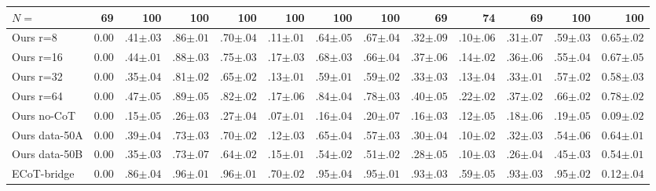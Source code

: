 \documentclass{article}
\begin{document}
\begin{table}[t]
\begin{tabular}{l r r r r r r r r r r r | r}
$N=$ & 69 & 100 & 100 & 100 & 100 & 100 & 100 & 69 & 74 & 69 & 100 & 100 \\
\midrule
Ours r=8       & 0.00 & .41\tiny{$\pm .03$} & .86\tiny{$\pm .01$} & .70\tiny{$\pm .04$} & .11\tiny{$\pm .01$} & .64\tiny{$\pm .05$} & .67\tiny{$\pm .04$} & .32\tiny{$\pm .09$} & .10\tiny{$\pm .06$} & .31\tiny{$\pm .07$} & .59\tiny{$\pm .03$} & 0.65\tiny{$\pm .02$} \\
Ours r=16      & 0.00 & .44\tiny{$\pm .01$} & .88\tiny{$\pm .03$} & .75\tiny{$\pm .03$} & .17\tiny{$\pm .03$} & .68\tiny{$\pm .03$} & .66\tiny{$\pm .04$} & .37\tiny{$\pm .06$} & .14\tiny{$\pm .02$} & .36\tiny{$\pm .06$} & .55\tiny{$\pm .04$} & 0.67\tiny{$\pm .05$} \\
Ours r=32      & 0.00 & .35\tiny{$\pm .04$} & .81\tiny{$\pm .02$} & .65\tiny{$\pm .02$} & .13\tiny{$\pm .01$} & .59\tiny{$\pm .01$} & .59\tiny{$\pm .02$} & .33\tiny{$\pm .03$} & .13\tiny{$\pm .04$} & .33\tiny{$\pm .01$} & .57\tiny{$\pm .02$} & 0.58\tiny{$\pm .03$} \\
Ours r=64      & 0.00 & .47\tiny{$\pm .05$} & .89\tiny{$\pm .05$} & .82\tiny{$\pm .02$} & .17\tiny{$\pm .06$} & .84\tiny{$\pm .04$} & .78\tiny{$\pm .03$} & .40\tiny{$\pm .05$} & .22\tiny{$\pm .02$} & .37\tiny{$\pm .02$} & .66\tiny{$\pm .02$} & 0.78\tiny{$\pm .02$} \\
Ours no-CoT    & 0.00 & .15\tiny{$\pm .05$} & .26\tiny{$\pm .03$} & .27\tiny{$\pm .04$} & .07\tiny{$\pm .01$} & .16\tiny{$\pm .04$} & .20\tiny{$\pm .07$} & .16\tiny{$\pm .03$} & .12\tiny{$\pm .05$} & .18\tiny{$\pm .06$} & .19\tiny{$\pm .05$} & 0.09\tiny{$\pm .02$} \\
Ours data-50A  & 0.00 & .39\tiny{$\pm .04$} & .73\tiny{$\pm .03$} & .70\tiny{$\pm .02$} & .12\tiny{$\pm .03$} & .65\tiny{$\pm .04$} & .57\tiny{$\pm .03$} & .30\tiny{$\pm .04$} & .10\tiny{$\pm .02$} & .32\tiny{$\pm .03$} & .54\tiny{$\pm .06$} & 0.64\tiny{$\pm .01$} \\
Ours data-50B  & 0.00 & .35\tiny{$\pm .03$} & .73\tiny{$\pm .07$} & .64\tiny{$\pm .02$} & .15\tiny{$\pm .01$} & .54\tiny{$\pm .02$} & .51\tiny{$\pm .02$} & .28\tiny{$\pm .05$} & .10\tiny{$\pm .03$} & .26\tiny{$\pm .04$} & .45\tiny{$\pm .03$} & 0.54\tiny{$\pm .01$} \\
ECoT-bridge & 0.00 & .86\tiny{$\pm .04$} & .96\tiny{$\pm .01$} & .96\tiny{$\pm .01$} & .70\tiny{$\pm .02$} & .95\tiny{$\pm .04$} & .95\tiny{$\pm .01$} & .93\tiny{$\pm .03$} & .59\tiny{$\pm .05$} & .93\tiny{$\pm .03$} & .95\tiny{$\pm .02$} & 0.12\tiny{$\pm .04$} \\
\bottomrule
\end{tabular}
\end{table}
\end{document}
